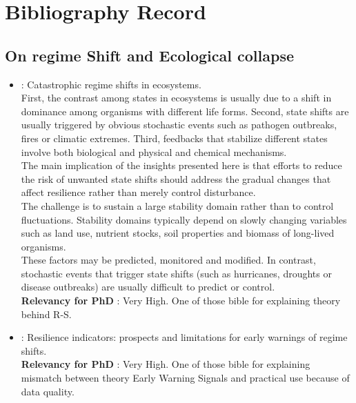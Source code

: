 \documentclass[]{report}
\begin{document}
	
	\tableofcontents
	
	\chapter{Bibliography Record}
	\section{On regime Shift and Ecological collapse}
	\begin{itemize}
		\subsection{Theory and Generalities on Regime Shift and resilience}
		
		\item \cite{scheffer2001catastrophic} : Catastrophic regime shifts in ecosystems.
		\\First, the contrast among states in ecosystems is usually due to a shift in dominance among organisms with different life forms.
		Second, state shifts are usually triggered by obvious stochastic events such as pathogen outbreaks, fires or climatic extremes.
		Third, feedbacks that stabilize different states involve both biological and physical and chemical mechanisms.
		\\The main implication of the insights presented here is that efforts to reduce the risk of unwanted state shifts should address the gradual changes that affect resilience rather than merely control disturbance.
		\\ The challenge is to sustain a large stability domain rather than to 	control fluctuations. Stability domains typically depend on slowly changing variables such as land use, nutrient stocks, soil
		properties and biomass of long-lived organisms.
		\\These factors may be predicted, monitored and modified. In contrast, stochastic events that trigger state shifts (such as hurricanes, droughts or disease outbreaks) are usually difficult to predict or control.
		\\\textbf{Relevancy for PhD} : Very High. One of those bible for explaining theory behind R-S.
		\item \cite{dakos2015resilience} : Resilience indicators: prospects and limitations for early warnings of regime shifts.
		\\\textbf{Relevancy for PhD} : Very High. One of those bible for explaining mismatch between theory Early Warning Signals and practical use because of data quality.

\end{itemize}
\end{document}
